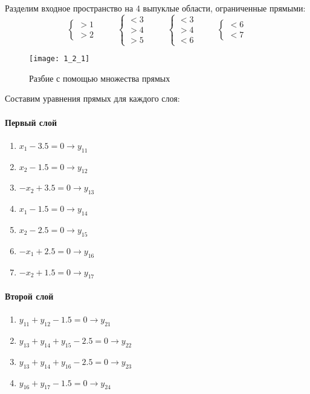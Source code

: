 Разделим входное пространство на 4 выпуклые области, ограниченные прямыми:
\begin{equation*}
	\begin{cases}
		>1\\
		>2
	\end{cases}
	\hspace{1cm}
	\begin{cases}
		<3\\
		>4\\
		>5
	\end{cases}
	\hspace{1cm}
	\begin{cases}
		<3\\
		>4\\
		<6
	\end{cases}
	\hspace{1cm}
	\begin{cases}
		<6\\
		<7
	\end{cases}
\end{equation*}

\begin{figure}[H]
\begin{center}
	\texttt{[image: 1\_2\_1]}
	\caption{Разбие с помощью множества прямых}
	\label{fig:1_2_1}
\end{center}
\end{figure}

Составим уравнения прямых для каждого слоя:

\paragraph{Первый слой}
\begin{enumerate}
	\item $x_1 - 3.5 = 0 \rightarrow y_{11}$
	\item $x_2 - 1.5 = 0 \rightarrow y_{12}$
	\item $-x_2 + 3.5 = 0 \rightarrow y_{13}$
	\item $x_1 - 1.5 = 0 \rightarrow y_{14}$
	\item $x_2 - 2.5 = 0 \rightarrow y_{15}$
	\item $-x_1 + 2.5 = 0 \rightarrow y_{16}$
	\item $-x_2 + 1.5 = 0 \rightarrow y_{17}$
\end{enumerate}

\paragraph{Второй слой}
\begin{enumerate}
	\item $y_{11} + y_{12} - 1.5 = 0 \rightarrow y_{21}$
	\item $y_{13} + y_{14} + y_{15} - 2.5 = 0 \rightarrow y_{22}$
	\item $y_{13} + y_{14} + y_{16} - 2.5 = 0 \rightarrow y_{23}$
	\item $y_{16} + y_{17} - 1.5 = 0 \rightarrow y_{24}$
\end{enumerate}

